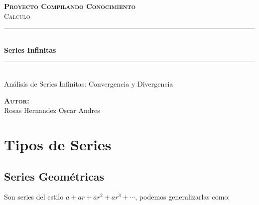 \documentclass[12pt]{report}							    %
\author{Oscar Andrés Rosas}						            %
\begin{document}
\begin{titlepage}

	\center
	\textbf{\textsc{\Large Proyecto Compilando Conocimiento}}\\[1.0cm] 
	\textsc{\Large Calculo}\\[1.0cm] 

	\rule{\linewidth}{0.5mm} \\[1.0cm]
		{ \huge \bfseries Series Infinitas}\\[1.0cm] 
	\rule{\linewidth}{0.5mm} \\[2.0cm]
	
	{\LARGE Análisis de Series Infinitas: Convergencia y Divergencia}\\[7cm] 
	
	\begin{center} \large
	\textbf{\textsc{Autor:}}\\
	Rosas Hernandez Oscar Andres
	\end{center}

	\vfill

\end{titlepage}

\tableofcontents{}
\clearpage

\chapter{Tipos de Series}
    \clearpage

    \section{Series Geométricas}
        Son series del estilo $a + ar + ar^2 + ar^3 + \cdots$, podemos
        generalizarlas como:
\end{document}
